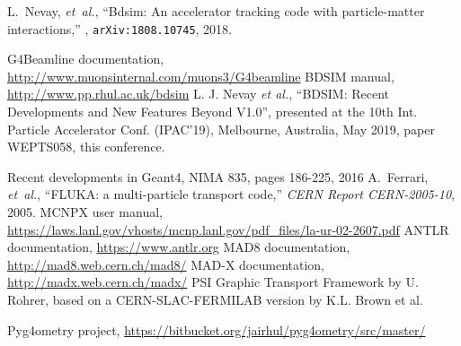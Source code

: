 \documentclass[a4paper,
               keeplastbox,   %
               ]{jacow}
\begin{document}
%
{\printbibliography}%
{%
  
  \begin{thebibliography}{9} %
    
     L.~Nevay, \emph{ et~al.}, ``Bdsim: An accelerator tracking code with particle-matter interactions,'' , {\tt arXiv:1808.10745}, 2018.
      
       G4Beamline documentation, \url{http://www.muonsinternal.com/muons3/G4beamline}
          BDSIM manual, \url{http://www.pp.rhul.ac.uk/bdsim}
           L. J. Nevay \emph{et al.}, \textquotedblleft{BDSIM: Recent Developments and New Features Beyond V1.0}\textquotedblright, presented at the 10th Int. Particle Accelerator Conf. (IPAC'19), Melbourne, Australia, May 2019, paper WEPTS058, this conference.
            
           Recent developments in Geant4, NIMA 835, pages 186-225, 2016 
             A.~Ferrari, {\em et~al.}, ``{FLUKA}: a multi-particle transport code,'' {\em   CERN Report CERN-2005-10}, 2005.
     MCNPX user manual,  \url{https://laws.lanl.gov/vhosts/mcnp.lanl.gov/pdf\_files/la-ur-02-2607.pdf}
     ANTLR documentation, \url{https://www.antlr.org}
       MAD8 documentation, \url{http://mad8.web.cern.ch/mad8/}
         MAD-X documentation, \url{http://madx.web.cern.ch/madx/}
           PSI Graphic Transport Framework by U. Rohrer, based on a CERN-SLAC-FERMILAB version by K.L. Brown et al. 
            
             Pyg4ometry project, \url{https://bitbucket.org/jairhul/pyg4ometry/src/master/}

              \end{thebibliography}
} %
\end{document}
